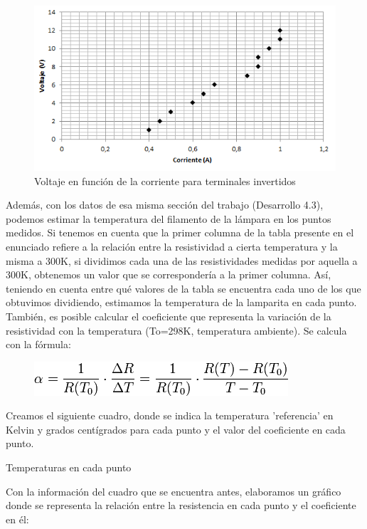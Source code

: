 \documentclass{article}
\begin{document}
\begin{figure}[H]
\centering
\includegraphics[scale=0.7]{lamparitaTerminalesInvertidos.png}
\caption{Voltaje en función de la corriente para terminales invertidos}
\end{figure}

Además, con los datos de esa misma sección del trabajo (Desarrollo 4.3), podemos estimar la temperatura del filamento de la lámpara en los puntos medidos. Si tenemos en cuenta que la primer columna de la tabla presente en el enunciado refiere a la relación entre la resistividad a cierta temperatura y la misma a 300K, si dividimos cada una de las resistividades medidas por aquella a 300K, obtenemos un valor que se correspondería a la primer columna. Así, teniendo en cuenta entre qué valores de la tabla se encuentra cada uno de los que obtuvimos dividiendo, estimamos la temperatura de la lamparita en cada punto.
También, es posible calcular el coeficiente que representa la variación de la resistividad con la temperatura (To=298K, temperatura ambiente). Se calcula con la fórmula:
\begin{figure}[H]
\centering
\includegraphics[scale=0.5]{alpha.png}
\end{figure}

Creamos el siguiente cuadro, donde se indica la temperatura 'referencia' en Kelvin y grados centígrados para cada punto y el valor del coeficiente en cada punto.


\begin{table}[H]
\centering

\caption{Temperaturas en cada punto}
\end{table}

Con la información del cuadro que se encuentra antes, elaboramos un gráfico donde se representa la relación entre la resistencia en cada punto y el coeficiente en él:
\end{document}
